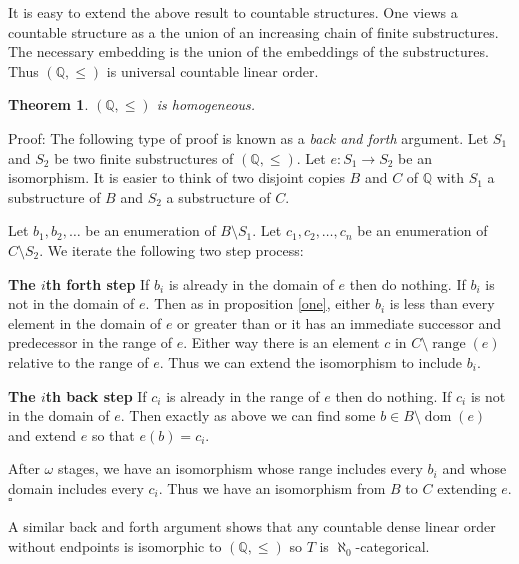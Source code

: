 \documentclass[12pt]{article}
\newtheorem{theorem}{Theorem}
\def\Q{\mathbb{Q}}
\def\dom{\operatorname{dom}}
\def\range{\operatorname{range}}
\begin{document}
It is easy to extend the above result to countable structures. 
One views a countable structure as a the union of an increasing chain of finite substructures. 
The necessary embedding is the union of the embeddings of the substructures. Thus $(\Q,\leq)$ is universal countable linear order.

\begin{theorem} $(\Q,\leq)$ is homogeneous. \end{theorem}
Proof: The following type of proof is known as a {\em back and forth} argument. 
Let $S_{1}$ and $S_{2}$ be two finite substructures of $(\Q,\leq)$. 
Let $e:S_{1} \to S_{2}$ be an isomorphism. 
It is easier to think of two disjoint copies $B$ and $C$ of $\Q$ with $S_{1}$ a substructure of $B$ and $S_{2}$ a substructure of $C$.

Let $b_{1},b_{2},\ldots$ be an enumeration of $B \setminus S_{1}$. 
Let $c_{1},c_{2},\ldots,c_{n}$ be an enumeration of $C \setminus S_{2}$.  We iterate the following two step process:

{\bf The $i$th forth step} If  $b_{i}$ is already in the domain of $e$ then do nothing. If $b_{i}$ is not in the domain of $e$. 
Then as in proposition \ref{one}, either $b_{i}$ is less than every element in the domain of $e$ or greater than or it has an immediate successor and predecessor in the range of $e$.
Either way there is an element  $c$ in $C \setminus\range(e)$ relative to the range of $e$. 
Thus we can extend the isomorphism to include $b_{i}$.

{\bf The $i$th back step} If  $c_{i}$ is already in the range of $e$ then do nothing. If $c_{i}$ is not in the domain of $e$. 
Then exactly as above we can find some $b \in B \setminus \dom(e)$ and extend $e$ so that $e(b)=c_{i}$.

After $\omega$ stages, we have an isomorphism whose range includes every $b_{i}$ and whose domain includes every $c_{i}$. Thus we have an isomorphism from $B$ to $C$ extending $e$. $\square$

A similar back and forth argument shows that any countable dense linear order without endpoints is isomorphic to $(\Q,\leq)$ so $T$ is $\aleph_{0}$-categorical.
\end{document}
